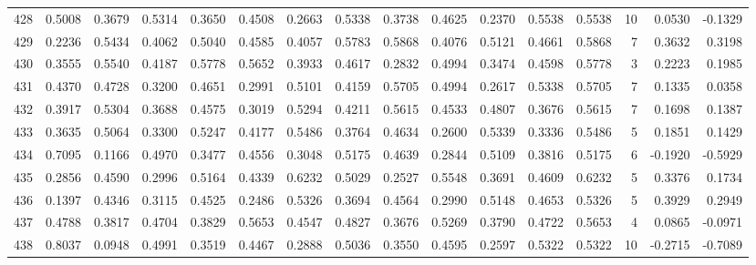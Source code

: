 \begin{tabular}{lrrrrrrrrrrrrrrr}
428 &      0.5008 &  0.3679 &  0.5314 &  0.3650 &  0.4508 &  0.2663 &  0.5338 &  0.3738 &  0.4625 &  0.2370 &   0.5538 &     0.5538 &     10 &                    0.0530 &                    -0.1329 \\
429 &      0.2236 &  0.5434 &  0.4062 &  0.5040 &  0.4585 &  0.4057 &  0.5783 &  0.5868 &  0.4076 &  0.5121 &   0.4661 &     0.5868 &      7 &                    0.3632 &                     0.3198 \\
430 &      0.3555 &  0.5540 &  0.4187 &  0.5778 &  0.5652 &  0.3933 &  0.4617 &  0.2832 &  0.4994 &  0.3474 &   0.4598 &     0.5778 &      3 &                    0.2223 &                     0.1985 \\
431 &      0.4370 &  0.4728 &  0.3200 &  0.4651 &  0.2991 &  0.5101 &  0.4159 &  0.5705 &  0.4994 &  0.2617 &   0.5338 &     0.5705 &      7 &                    0.1335 &                     0.0358 \\
432 &      0.3917 &  0.5304 &  0.3688 &  0.4575 &  0.3019 &  0.5294 &  0.4211 &  0.5615 &  0.4533 &  0.4807 &   0.3676 &     0.5615 &      7 &                    0.1698 &                     0.1387 \\
433 &      0.3635 &  0.5064 &  0.3300 &  0.5247 &  0.4177 &  0.5486 &  0.3764 &  0.4634 &  0.2600 &  0.5339 &   0.3336 &     0.5486 &      5 &                    0.1851 &                     0.1429 \\
434 &      0.7095 &  0.1166 &  0.4970 &  0.3477 &  0.4556 &  0.3048 &  0.5175 &  0.4639 &  0.2844 &  0.5109 &   0.3816 &     0.5175 &      6 &                   -0.1920 &                    -0.5929 \\
435 &      0.2856 &  0.4590 &  0.2996 &  0.5164 &  0.4339 &  0.6232 &  0.5029 &  0.2527 &  0.5548 &  0.3691 &   0.4609 &     0.6232 &      5 &                    0.3376 &                     0.1734 \\
436 &      0.1397 &  0.4346 &  0.3115 &  0.4525 &  0.2486 &  0.5326 &  0.3694 &  0.4564 &  0.2990 &  0.5148 &   0.4653 &     0.5326 &      5 &                    0.3929 &                     0.2949 \\
437 &      0.4788 &  0.3817 &  0.4704 &  0.3829 &  0.5653 &  0.4547 &  0.4827 &  0.3676 &  0.5269 &  0.3790 &   0.4722 &     0.5653 &      4 &                    0.0865 &                    -0.0971 \\
438 &      0.8037 &  0.0948 &  0.4991 &  0.3519 &  0.4467 &  0.2888 &  0.5036 &  0.3550 &  0.4595 &  0.2597 &   0.5322 &     0.5322 &     10 &                   -0.2715 &                    -0.7089 \\

\end{tabular}
